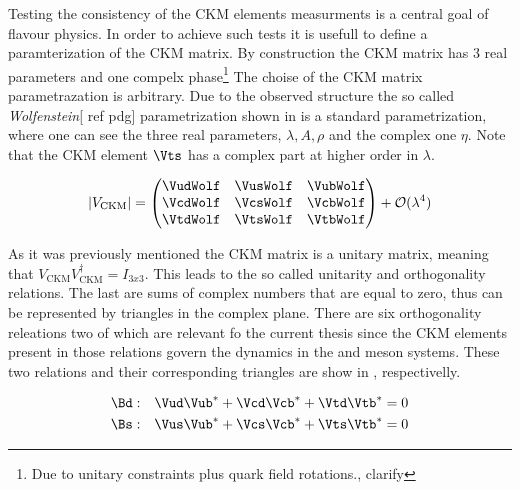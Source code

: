 Testing the consistency of the CKM elements measurments is a central goal of flavour physics.
In order to achieve such tests it is usefull to define a paramterization of the CKM matrix.
By construction the CKM matrix has 3 real parameters and one compelx phase\footnote{Due to unitary constraints plus quark field rotations.,{\color{red} clarify}}
The choise of the CKM matrix parametrazation is arbitrary. Due to the observed structure the so called {\it Wolfenstein}[{\color{red} ref pdg}]
parametrization shown in  is a standard parametrization, where one can see the three real parameters, $\lambda,A,\rho$
and the complex one $\eta$. Note that the CKM element $\Vts$ has a complex part at higher order in $\lambda$.

\begin{equation}
  |V_{\text{CKM}}|
                   = \begin{pmatrix} \VudWolf & \VusWolf & \VubWolf \\
                                     \VcdWolf & \VcsWolf & \VcbWolf \\
                                     \VtdWolf & \VtsWolf & \VtbWolf \end{pmatrix} + \mathcal{O}(\lambda^4)
      \label{CKMwolfenstein}
\end{equation}

\noindent As it was previously mentioned the CKM matrix is a unitary matrix, meaning that $V_{\text{CKM}} V_{\text{CKM}}^\dagger = I_{3x3}$.
This leads to the so called unitarity and orthogonality relations. The last are sums of complex numbers that are equal to zero, thus can be
represented by triangles in the complex plane. There are six orthogonality releations two of which are relevant fo the current thesis since
the CKM elements present in those relations govern the dynamics in the \Bs and \Bd meson systems. These two relations and their corresponding
triangles are show in ,  respectivelly.

\begin{subequations}
  \label{unitConstraints}
  \begin{align}
    \Bd : & \quad \Vud\Vub^* + \Vcd\Vcb^* + \Vtd\Vtb^* = 0
    \label{unitConstraints_Bd} \\
    \Bs : & \quad \Vus\Vub^* + \Vcs\Vcb^* + \Vts\Vtb^* = 0
    \label{unitConstraints_Bs}
  \end{align}
\end{subequations}

